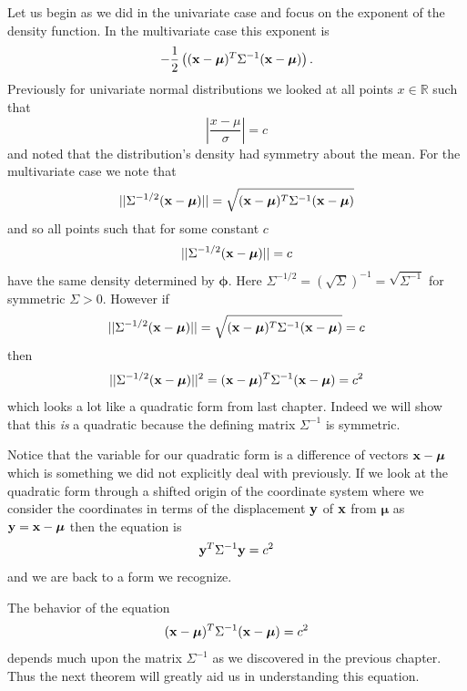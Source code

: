 \documentclass{book}
\newcommand{\bs}[1]{\boldsymbol{#1}}
\begin{document}
Let us begin as we did in the univariate case and focus on the exponent of the density function. In the multivariate case this exponent is 
$$
-\frac{1}{2}\left(({\bf x}-\bs{\mu})^T\Sigma^{-1}({\bf x}-\bs{\mu})\right).
$$
Previously for univariate normal distributions we looked at all points $x\in\mathbb{R}$ such that
$$
\left|\frac{x-\mu}{\sigma}\right|=c
$$
and noted that the distribution's density had symmetry about the mean. For the multivariate case we note that 
$$
||\Sigma^{-1/2}({\bf x}-\bs{\mu})||=\sqrt{({\bf x}-\bs{\mu})^T\Sigma^{-1}({\bf x}-\bs{\mu})}
$$
and so all points such that for some constant $c$
$$
||\Sigma^{-1/2}({\bf x}-\bs{\mu})||=c
$$
have the same density determined by $\bs{\phi}$. Here $\Sigma^{-1/2}=\left(\sqrt{\Sigma}\right)^{-1}=\sqrt{\Sigma^{-1}}$ for symmetric $\Sigma>0$. However if
$$
||\Sigma^{-1/2}({\bf x}-\bs{\mu})||=\sqrt{({\bf x}-\bs{\mu})^T\Sigma^{-1}({\bf x}-\bs{\mu})}=c
$$
then
$$
||\Sigma^{-1/2}({\bf x}-\bs{\mu})||^2=({\bf x}-\bs{\mu})^T\Sigma^{-1}({\bf x}-\bs{\mu})=c^2
$$
which looks a lot like a quadratic form from last chapter. Indeed we will show that this \emph{is} a quadratic because the defining matrix $\Sigma^{-1}$ is symmetric. 

Notice that the variable for our quadratic form is a difference of vectors ${\bf x}-\bs{\mu}$ which is something we did not explicitly deal with previously. If we look at the quadratic form through a shifted origin of the coordinate system where we consider the coordinates in terms of the displacement ${\bf y}$ of ${\bf x}$ from $\bs{\mu}$ as ${\bf y}={\bf x}-\bs{\mu}$ then the equation is 
$$
{\bf y}^T\Sigma^{-1}{\bf y}=c^2
$$
and we are back to a form we recognize. 

The behavior of the equation 
$$
({\bf x}-\bs{\mu})^T\Sigma^{-1}({\bf x}-\bs{\mu})=c^2
$$
depends much upon the matrix $\Sigma^{-1}$ as we discovered in the previous chapter. Thus the next theorem will greatly aid us in understanding this equation. 

\end{document}
